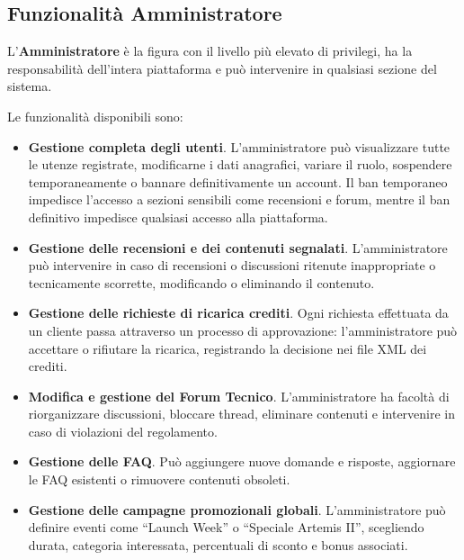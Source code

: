 \documentclass[a4paper,12pt]{report}
\begin{document}
\subsection{Funzionalità Amministratore}
\label{sec:admin}

L’\textbf{Amministratore} è la figura con il livello più elevato di privilegi,
ha la responsabilità dell’intera piattaforma e può intervenire in qualsiasi
sezione del sistema.

Le funzionalità disponibili sono:

\begin{itemize}
    \item \textbf{Gestione completa degli utenti}.  
    L’amministratore può visualizzare tutte le utenze registrate,
    modificarne i dati anagrafici, variare il ruolo, sospendere temporaneamente
    o bannare definitivamente un account.  
    Il ban temporaneo impedisce l’accesso a sezioni sensibili come recensioni
    e forum, mentre il ban definitivo impedisce qualsiasi accesso alla piattaforma.

    \item \textbf{Gestione delle recensioni e dei contenuti segnalati}.  
    L’amministratore può intervenire in caso di recensioni o discussioni
    ritenute inappropriate o tecnicamente scorrette,
    modificando o eliminando il contenuto.

    \item \textbf{Gestione delle richieste di ricarica crediti}.  
    Ogni richiesta effettuata da un cliente passa attraverso un processo di approvazione:
    l’amministratore può accettare o rifiutare la ricarica,
    registrando la decisione nei file XML dei crediti.

    \item \textbf{Modifica e gestione del Forum Tecnico}.  
    L’amministratore ha facoltà di riorganizzare discussioni,
    bloccare thread, eliminare contenuti e intervenire in caso di violazioni
    del regolamento.

    \item \textbf{Gestione delle FAQ}.  
    Può aggiungere nuove domande e risposte,
    aggiornare le FAQ esistenti o rimuovere contenuti obsoleti.

    \item \textbf{Gestione delle campagne promozionali globali}.  
    L’amministratore può definire eventi come ``Launch Week'' o
    ``Speciale Artemis II'', scegliendo durata, categoria interessata,
    percentuali di sconto e bonus associati.
    
\end{itemize}
\end{document}

